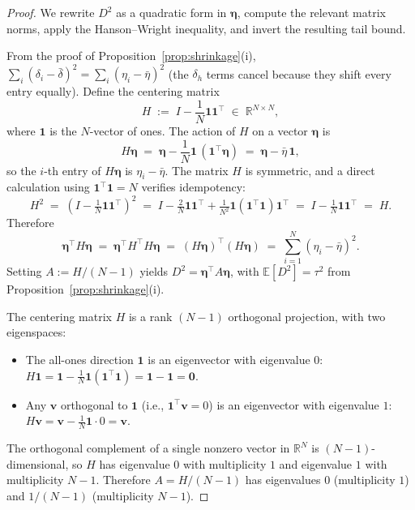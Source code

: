 \documentclass{article}
\begin{document}
\begin{proof}
We rewrite $D^2$ as a quadratic form in $\boldsymbol{\eta}$, compute the relevant matrix norms, apply the Hanson--Wright inequality, and invert the resulting tail bound.

From the proof of Proposition~\ref{prop:shrinkage}(i), $\sum_i (\delta_i - \bar\delta)^2 = \sum_i (\eta_i - \bar\eta)^2$ (the $\delta_h$ terms cancel because they shift every entry equally). Define the centering matrix
\begin{equation*}
H \;:=\; I - \frac{1}{N}\mathbf{1}\mathbf{1}^\top \;\in\; \mathbb{R}^{N\times N},
\end{equation*}
where $\mathbf{1}$ is the $N$-vector of ones. The action of $H$ on a vector $\boldsymbol{\eta}$ is
\begin{equation*}
H\boldsymbol{\eta} \;=\; \boldsymbol{\eta} - \frac{1}{N}\mathbf{1}\,(\mathbf{1}^\top\boldsymbol{\eta}) \;=\; \boldsymbol{\eta} - \bar\eta\,\mathbf{1},
\end{equation*}
so the $i$-th entry of $H\boldsymbol{\eta}$ is $\eta_i - \bar\eta$. The matrix $H$ is symmetric, and a direct calculation using $\mathbf{1}^\top\mathbf{1} = N$ verifies idempotency:
\begin{equation*}
H^2 \;=\; \left(I - \tfrac{1}{N}\mathbf{1}\mathbf{1}^\top\right)^2 
\;=\; I - \tfrac{2}{N}\mathbf{1}\mathbf{1}^\top + \tfrac{1}{N^2}\mathbf{1}(\mathbf{1}^\top\mathbf{1})\mathbf{1}^\top
\;=\; I - \tfrac{1}{N}\mathbf{1}\mathbf{1}^\top \;=\; H.
\end{equation*}
Therefore
\begin{equation*}
\boldsymbol{\eta}^\top H \boldsymbol{\eta} \;=\; \boldsymbol{\eta}^\top H^\top H \boldsymbol{\eta} \;=\; (H\boldsymbol{\eta})^\top(H\boldsymbol{\eta}) \;=\; \sum_{i=1}^N (\eta_i - \bar\eta)^2.
\end{equation*}
Setting $A := H/(N-1)$ yields $D^2 = \boldsymbol{\eta}^\top A \boldsymbol{\eta}$, with $\mathbb{E}[D^2] = \tau^2$ from Proposition~\ref{prop:shrinkage}(i).

The centering matrix $H$ is a rank $(N-1)$ orthogonal projection, with two eigenspaces:
\begin{itemize}
\item The all-ones direction $\mathbf{1}$ is an eigenvector with eigenvalue $0$: $H\mathbf{1} = \mathbf{1} - \tfrac{1}{N}\mathbf{1}(\mathbf{1}^\top\mathbf{1}) = \mathbf{1} - \mathbf{1} = \mathbf{0}$.
\item Any $\mathbf{v}$ orthogonal to $\mathbf{1}$ (i.e., $\mathbf{1}^\top\mathbf{v} = 0$) is an eigenvector with eigenvalue $1$: $H\mathbf{v} = \mathbf{v} - \tfrac{1}{N}\mathbf{1}\cdot 0 = \mathbf{v}$.
\end{itemize}
The orthogonal complement of a single nonzero vector in $\mathbb{R}^N$ is $(N-1)$-dimensional, so $H$ has eigenvalue $0$ with multiplicity $1$ and eigenvalue $1$ with multiplicity $N-1$. Therefore $A = H/(N-1)$ has eigenvalues $0$ (multiplicity $1$) and $1/(N-1)$ (multiplicity $N-1$).


\end{proof}
\end{document}
